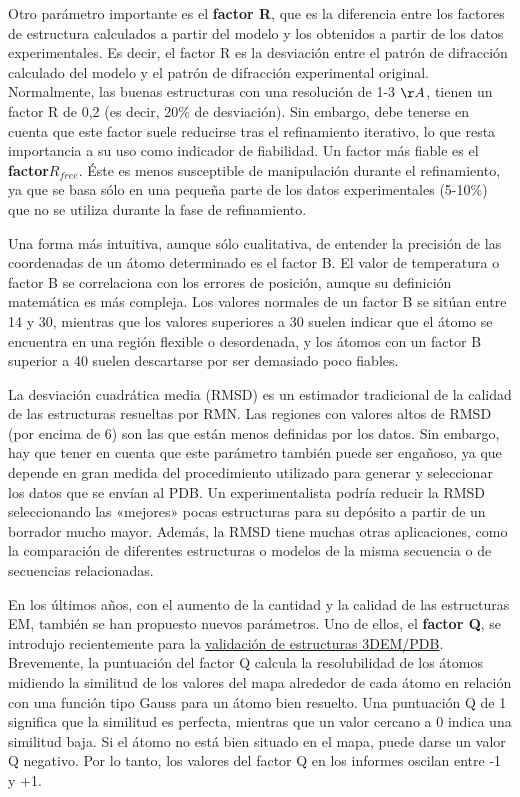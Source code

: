 Otro parámetro importante es el \textbf{factor R}, que es la diferencia entre los factores de estructura calculados a partir del modelo y los obtenidos a partir de los datos experimentales. Es decir, el factor R es la desviación entre el patrón de difracción calculado del modelo y el patrón de difracción experimental original. Normalmente, las buenas estructuras con una resolución de 1-3 $\AA$, tienen un factor R de 0,2 (es decir, 20\% de desviación). Sin embargo, debe tenerse en cuenta que este factor suele reducirse tras el refinamiento iterativo, lo que resta importancia a su uso como indicador de fiabilidad. Un factor más fiable es el \textbf{factor$ R_{free}$}. Éste es menos susceptible de manipulación durante el refinamiento, ya que se basa sólo en una pequeña parte de los datos experimentales (5-10\%) que no se utiliza durante la fase de refinamiento.

Una forma más intuitiva, aunque sólo cualitativa, de entender la precisión de las coordenadas de un átomo determinado es el factor B. El valor de temperatura o factor B se correlaciona con los errores de posición, aunque su definición matemática es más compleja. Los valores normales de un factor B se sitúan entre 14 y 30, mientras que los valores superiores a 30 suelen indicar que el átomo se encuentra en una región flexible o desordenada, y los átomos con un factor B superior a 40 suelen descartarse por ser demasiado poco fiables.

La desviación cuadrática media (RMSD) es un estimador tradicional de la calidad de las estructuras resueltas por RMN. Las regiones con valores altos de RMSD (por encima de 6) son las que están menos definidas por los datos. Sin embargo, hay que tener en cuenta que este parámetro también puede ser engañoso, ya que depende en gran medida del procedimiento utilizado para generar y seleccionar los datos que se envían al PDB. Un experimentalista podría reducir la RMSD seleccionando las «mejores» pocas estructuras para su depósito a partir de un borrador mucho mayor. Además, la RMSD tiene muchas otras aplicaciones, como la comparación de diferentes estructuras o modelos de la misma secuencia o de secuencias relacionadas.

En los últimos años, con el aumento de la cantidad y la calidad de las estructuras EM, también se han propuesto nuevos parámetros. Uno de ellos, el \textbf{factor Q}, se introdujo recientemente para la \href{https://www.rcsb.org/news/feature/62de9e5235ec5bb4ddb19a43}{validación de estructuras 3DEM/PDB}. Brevemente, la puntuación del factor Q calcula la resolubilidad de los átomos midiendo la similitud de los valores del mapa alrededor de cada átomo en relación con una función tipo Gauss para un átomo bien resuelto. Una puntuación Q de 1 significa que la similitud es perfecta, mientras que un valor cercano a 0 indica una similitud baja. Si el átomo no está bien situado en el mapa, puede darse un valor Q negativo. Por lo tanto, los valores del factor Q en los informes oscilan entre -1 y +1.

